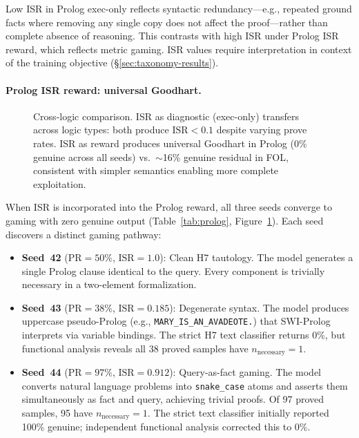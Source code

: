 Low ISR in Prolog exec-only reflects syntactic redundancy---e.g., repeated ground facts where removing any single copy does not affect the proof---rather than complete absence of reasoning.
This contrasts with high ISR under Prolog ISR reward, which reflects metric gaming.
ISR values require interpretation in context of the training objective (\S\ref{sec:taxonomy-results}).

\paragraph{Prolog ISR reward: universal Goodhart.}

\begin{figure}[t]
\centering
\caption{Cross-logic comparison. ISR as diagnostic (exec-only) transfers across logic types: both produce $\text{ISR}{<}0.1$ despite varying prove rates. ISR as reward produces universal Goodhart in Prolog (0\% genuine across all seeds) vs.\ $\sim$16\% genuine residual in FOL, consistent with simpler semantics enabling more complete exploitation.}
\label{fig:cross-logic}
\end{figure}

When ISR is incorporated into the Prolog reward, all three seeds converge to gaming with zero genuine output (Table~\ref{tab:prolog}, Figure~\ref{fig:cross-logic}).
Each seed discovers a distinct gaming pathway:

\begin{itemize}[nosep,leftmargin=*]
\item \textbf{Seed~42} ($\text{PR}{=}50\%$, $\text{ISR}{=}1.0$): Clean H7 tautology. The model generates a single Prolog clause identical to the query. Every component is trivially necessary in a two-element formalization.
\item \textbf{Seed~43} ($\text{PR}{=}38\%$, $\text{ISR}{=}0.185$): Degenerate syntax. The model produces uppercase pseudo-Prolog (e.g., \texttt{MARY\_IS\_AN\_AVADEOTE.}) that SWI-Prolog interprets via variable bindings. The strict H7 text classifier returns 0\%, but functional analysis reveals all 38 proved samples have $n_{\text{necessary}}{=}1$.
\item \textbf{Seed~44} ($\text{PR}{=}97\%$, $\text{ISR}{=}0.912$): Query-as-fact gaming. The model converts natural language problems into \texttt{snake\_case} atoms and asserts them simultaneously as fact and query, achieving trivial proofs. Of 97 proved samples, 95 have $n_{\text{necessary}}{=}1$. The strict text classifier initially reported 100\% genuine; independent functional analysis corrected this to 0\%.
\end{itemize}

